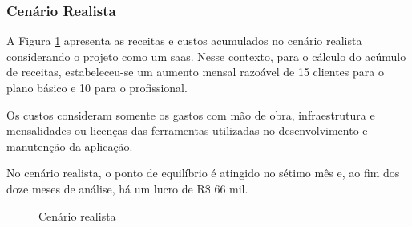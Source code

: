 \subsubsection{Cenário Realista}

A Figura \ref{fig:cenario-realista} apresenta as receitas e custos acumulados no cenário realista considerando o projeto como um \gls{saas}. Nesse contexto, para o cálculo do acúmulo de receitas, estabeleceu-se um aumento mensal razoável de 15 clientes para o plano básico e 10 para o profissional.

Os custos consideram somente os gastos com mão de obra, infraestrutura e mensalidades ou licenças das ferramentas utilizadas no desenvolvimento e manutenção da aplicação.

No cenário realista, o ponto de equilíbrio é atingido no sétimo mês e, ao fim dos doze meses de análise, há um lucro de R\$ 66 mil.

\begin{figure}[h]
	\centering
	\caption{Cenário realista}
	\label{fig:cenario-realista}
\end{figure}